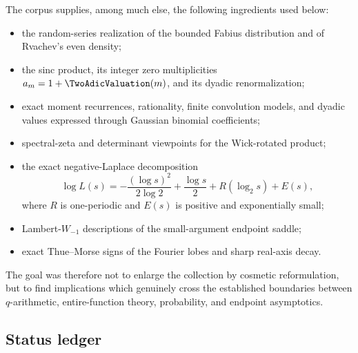 \documentclass[11pt]{article}
\numberwithin{equation}{section}
\theoremstyle{definition}
\theoremstyle{remark}
\begin{document}
The corpus supplies, among much else, the following ingredients used below:
\begin{itemize}
\item the random-series realization of the bounded Fabius distribution and of
      Rvachev's even density;
\item the sinc product, its integer zero multiplicities
      $a_m=1+\TwoAdicValuation(m)$, and its dyadic renormalization;
\item exact moment recurrences, rationality, finite convolution models, and
      dyadic values expressed through Gaussian binomial coefficients;
\item spectral-zeta and determinant viewpoints for the Wick-rotated product;
\item the exact negative-Laplace decomposition
      \[
      \log L(s)=-\frac{(\log s)^2}{2\log2}+\frac{\log s}{2}
        +R(\log_2s)+E(s),
      \]
      where $R$ is one-periodic and $E(s)$ is positive and exponentially
      small;
\item Lambert-$W_{-1}$ descriptions of the small-argument endpoint saddle;
\item exact Thue--Morse signs of the Fourier lobes and sharp real-axis decay.
\end{itemize}
The goal was therefore not to enlarge the collection by cosmetic reformulation,
but to find implications which genuinely cross the established boundaries
between $q$-arithmetic, entire-function theory, probability, and endpoint
asymptotics.

\subsection{Status ledger}
\end{document}
